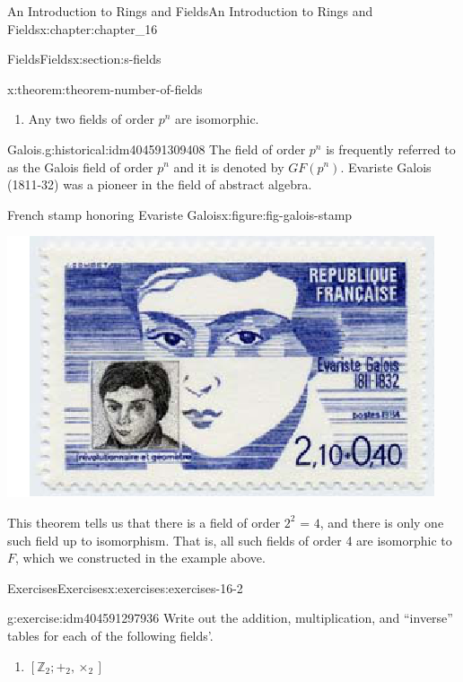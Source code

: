 \documentclass[twoside,10pt,]{book}
\numberwithin{equation}{section}
\begin{document}
\begin{chapterptx}{An Introduction to Rings and Fields}{}{An Introduction to Rings and Fields}{}{}{x:chapter:chapter_16}
\begin{sectionptx}{Fields}{}{Fields}{}{}{x:section:s-fields}
\begin{theorem}{}{}{x:theorem:theorem-number-of-fields}
\begin{enumerate}[label=(\arabic*)]
\item{}Any two fields of order \(p^n\) are isomorphic.%
\end{enumerate}
%
\end{theorem}
\begin{historical}{Galois.}{g:historical:idm404591309408}%
The field of order \(p^n\) is frequently referred to as the Galois field of order \(p^n\) and it is denoted by  \(GF(p^n)\).  Evariste Galois (1811-32) was a pioneer in the field of abstract algebra.%
\end{historical}
\begin{figureptx}{French stamp honoring Evariste Galois}{x:figure:fig-galois-stamp}{}%
\begin{image}{0.2}{0.6}{0.2}%
\includegraphics[width=\linewidth]{images/fig-galois-stamp.png}
\end{image}%
\tcblower
\end{figureptx}%
This theorem tells us  that there is a field of order \(2^2\textrm{ = 4}\), and there is only one such field up to isomorphism.   That is, all such fields of order 4 are isomorphic to \(F\), which we constructed in the example above.%
%
%
\typeout{************************************************}
\typeout{************************************************}
%
\begin{exercises-subsection}{Exercises}{}{Exercises}{}{}{x:exercises:exercises-16-2}
\begin{divisionexercise}{1}{}{}{g:exercise:idm404591297936}%
Write out the addition, multiplication, and ``inverse'' tables for each of the following fields'.%
\begin{enumerate}[label=(\alph*)]
\item{}\(\left[\mathbb{Z}_2; +_2, \times _2\right]\)%

\end{enumerate}
\end{divisionexercise}
\end{exercises-subsection}
\end{sectionptx}
\end{chapterptx}
\end{document}
